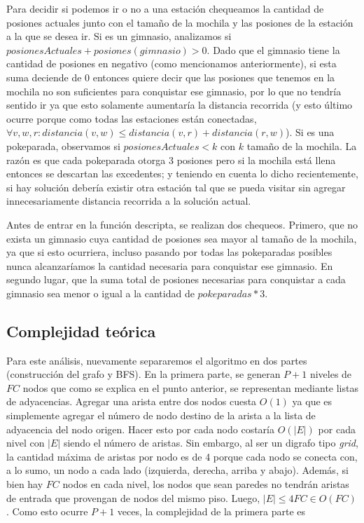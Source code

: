 \begin{itemize}
            Para decidir si podemos ir o no a una estación chequeamos la cantidad de posiones actuales junto con el tamaño de la mochila y las posiones de la estación a la que se desea ir. Si es un gimnasio, analizamos si $posionesActuales + posiones(gimnasio) > 0$. Dado que el gimnasio tiene la cantidad de posiones en negativo (como mencionamos anteriormente), si esta suma deciende de 0 entonces quiere decir que las posiones que tenemos en la mochila no son suficientes para conquistar ese gimnasio, por lo que no tendría sentido ir ya que esto solamente aumentaría la distancia recorrida (y esto último ocurre porque como todas las estaciones están conectadas,  $\forall v,w,r : distancia(v,w) \leq distancia(v,r) + distancia(r,w)$). Si es una pokeparada, observamos si $posionesActuales < k$ con $k$ tamaño de la mochila. La razón es que cada pokeparada otorga 3 posiones pero si la mochila está llena entonces se descartan las excedentes; y teniendo en cuenta lo dicho recientemente, si hay solución debería existir otra estación tal que se pueda visitar sin agregar innecesariamente distancia recorrida a la solución actual.

            Antes de entrar en la función descripta, se realizan dos chequeos. Primero, que no exista un gimnasio cuya cantidad de posiones sea mayor al tamaño de la mochila, ya que si esto ocurriera, incluso pasando por todas las pokeparadas posibles nunca alcanzaríamos la cantidad necesaria para conquistar ese gimnasio. En segundo lugar, que la suma total de posiones necesarias para conquistar a cada gimnasio sea menor o igual a la cantidad de $pokeparadas*3$.


    \subsection{Complejidad teórica}

      Para este análisis, nuevamente separaremos el algoritmo en dos partes (construcción del grafo y BFS). En la primera parte, se generan $P+1$ niveles de $FC$ nodos que como se explica en el punto anterior, se representan mediante listas de adyacencias. Agregar una arista entre dos nodos cuesta $O(1)$ ya que es simplemente agregar el número de nodo destino de la arista a la lista de adyacencia del nodo origen. Hacer esto por cada nodo costaría $O(|E|)$ por cada nivel con $|E|$ siendo el número de aristas. Sin embargo, al ser un digrafo tipo \textit{grid}, la cantidad máxima de aristas por nodo es de 4 porque cada nodo se conecta con, a lo sumo, un nodo a cada lado (izquierda, derecha, arriba y abajo). Además, si bien hay $FC$ nodos en cada nivel, los nodos que sean paredes no tendrán aristas de entrada que provengan de nodos del mismo piso. Luego, $|E| \leq 4FC \in O(FC)$. Como esto ocurre $P+1$ veces, la complejidad de la primera parte es


\end{itemize}
